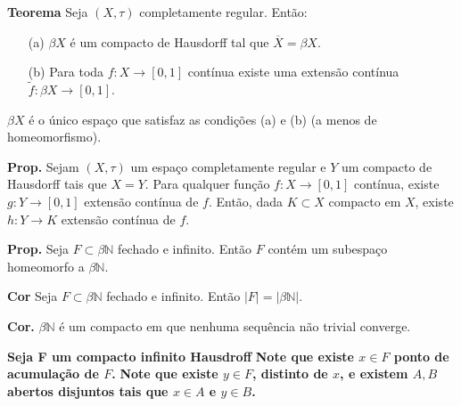 \documentclass{article}
\begin{document}
\begin{landscape}
\begin{multicols}{3}
\medskip

\textbf{Teorema} Seja \((X,\tau)\) completamente regular. Então:
\begin{itemize}
  \item[(a)] \(\beta X\) é um compacto de Hausdorff tal que \(\overline{X}=\beta X\).
  \item[(b)] Para toda \(f\colon X\to[0,1]\) contínua existe uma extensão contínua \(\widetilde f\colon\beta X\to[0,1]\).
\end{itemize}
 \color{Emerald}\(\beta X\) é o único espaço que satisfaz as condições (a) e (b) (a menos de homeomorfismo).\color{Black}

\medskip

\textbf{Prop.} Sejam \((X,\tau)\) um espaço completamente regular e \(Y\) um compacto de Hausdorff tais que \(X=Y\). Para qualquer função \(f\colon X\to[0,1]\) contínua, existe \(g\colon Y\to[0,1]\) extensão contínua de \(f\). Então, dada \(K\subset X\) compacto em \(X\), existe \(h\colon Y\to K\) extensão contínua de \(f\).

\medskip

\textbf{Prop.} Seja \(F\subset\beta\mathbb{N}\) fechado e infinito. Então \(F\) contém um subespaço homeomorfo a \(\beta\mathbb{N}\).

\medskip

\textbf{Cor} Seja \(F\subset\beta\mathbb{N}\) fechado e infinito. Então \(\lvert F\rvert = \lvert \beta\mathbb{N}\rvert\).

\medskip

\textbf{Cor.} \(\beta\mathbb{N}\) é um compacto em que nenhuma sequência não trivial converge.

\medskip
\color{Emerald}
\textbf{Seja F um compacto infinito Hausdroff}
 \textbf{ Note que existe \(x \in F\) ponto de acumulação de \(F\).}
  \textbf{ Note que existe \(y \in F\), distinto de \(x\), e existem \(A,B\) abertos disjuntos tais que \(x\in A\) e \(y\in B\).}

\end{multicols}
\end{landscape}
\end{document}

